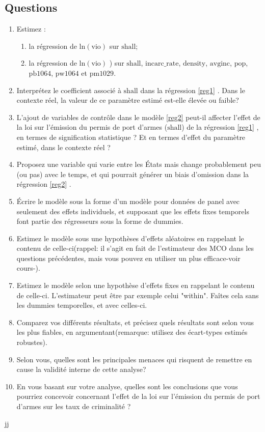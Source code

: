 \subsection{Questions}
\begin{enumerate}
\item Estimez : 
\begin{enumerate}
\item la régression de $\mathrm{ln(vio)}$ sur $\mathrm{shall}$;\label{reg1}
\item la régression de $\mathrm{ln(vio)}$ ) sur $\mathrm{shall}$, $\mathrm{incarc\_rate}$, $\mathrm{density}$, $\mathrm{avginc}$, $\mathrm{pop}$, $\mathrm{pb1064}$, $\mathrm{pw1064}$ et $\mathrm{pm1029}$\label{reg2}.
\end{enumerate}
\item Interprétez le coefficient associé à $\mathrm{shall}$ dans la régression \ref{reg1} . Dans le contexte
réel, la valeur de ce paramètre estimé est-elle élevée ou faible?
\item L'ajout de variables de contrôle dans le modèle \ref{reg2} peut-il affecter l'effet de la loi
sur l'émission du permis de port d'armes ($\mathrm{shall}$) de la régression \ref{reg1} , en termes
de signification statistique ? Et en termes d'effet du paramètre estimé, dans le
contexte réel ?
\item Proposez une variable qui varie entre les États mais change probablement peu (ou
pas) avec le temps, et qui pourrait générer un biais d'omission dans la régression \ref{reg2} .
\item Écrire le modèle sous la forme d'un modèle pour données de panel avec seulement des effets individuels, 
et supposant que les effets fixes temporels font partie des régresseurs sous la forme de dummies.
\item Estimez le modèle sous une hypothèses d'effets aléatoires en rappelant le contenu de celle-ci(rappel: il s'agit 
en fait de l'estimateur des MCO dans les questions précédentes, mais vous pouvez en utiliser un plus efficace-voir cours-).
\item Estimez le modèle selon une hypothèse d'effets fixes en rappelant le contenu de celle-ci. L'estimateur peut être par exemple celui "within".
 Faîtes cela sans les dummies temporelles, et avec celles-ci. 
 \item Comparez vos différents résultats,
et précisez quels résultats sont selon vous les plus fiables, en argumentant(remarque: utilisez des écart-types 
estimés robustes).
\item Selon vous, quelles sont les principales menaces qui risquent de remettre en cause la
validité interne de cette analyse?
\item En vous basant sur votre analyse, quelles sont les conclusions que 
vous pourriez concevoir concernant l'effet de la loi sur l'émission du permis de port d'armes sur les taux
de criminalité ?
\end{enumerate}
\begin{theoreme}
jj
\end{theoreme}


 
